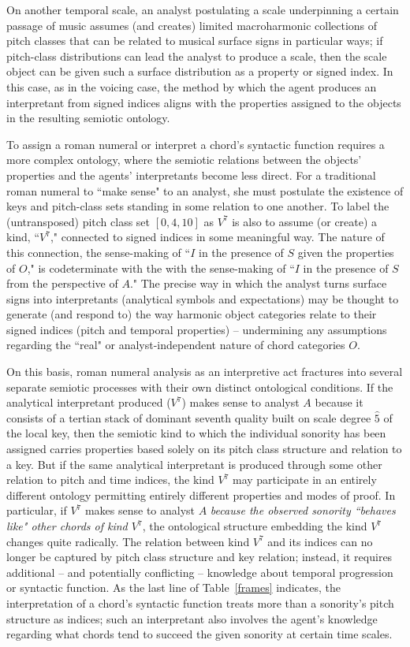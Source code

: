 On another temporal scale, an analyst postulating a scale underpinning a certain passage of music assumes (and creates) limited macroharmonic collections of pitch classes that can be related to musical surface signs in particular ways; if pitch-class distributions can lead the analyst to produce a scale, then the scale object can be given such a surface distribution as a property or signed index.  In this case, as in the voicing case, the method by which the agent produces an interpretant from signed indices aligns with the properties assigned to the objects in the resulting semiotic ontology.

To assign a roman numeral or interpret a chord's syntactic function requires a more complex ontology, where the semiotic relations between the objects' properties and the agents' interpretants become less direct.  For a traditional roman numeral to ``make sense" to an analyst, she must postulate the existence of keys and pitch-class sets standing in some relation to one another.  To label the (untransposed) pitch class set $[0,4,10]$ as $V^7$ is also to assume (or create) a kind, ``$V^7$," connected to signed indices in some meaningful way.  The nature of this connection, the sense-making of ``$I$ in the presence of $S$ given the properties of $O$," is codeterminate with the with the sense-making of ``$I$ in the presence of $S$ from the perspective of $A$."  The precise way in which the analyst turns surface signs into interpretants (analytical symbols and expectations) may be thought to generate (and respond to) the way harmonic object categories relate to their signed indices (pitch and temporal properties) -- undermining any assumptions regarding the ``real" or analyst-independent nature of chord categories $O$.

On this basis, roman numeral analysis as an interpretive act fractures into several separate semiotic processes with their own distinct ontological conditions.  If the analytical interpretant produced ($V^7$) makes sense to analyst $A$ because it consists of a tertian stack of dominant seventh quality built on scale degree $\hat{5}$ of the local key, then the semiotic kind to which the individual sonority has been assigned carries properties based solely on its pitch class structure and relation to a key.  But if the same analytical interpretant is produced through some other relation to pitch and time indices, the kind $V^7$ may participate in an entirely different ontology permitting entirely different properties and modes of proof.  In particular, if $V^7$ makes sense to analyst $A$ \emph{because the observed sonority ``behaves like" other chords of kind $V^7$}, the ontological structure embedding the kind $V^7$ changes quite radically.  The relation between kind $V^7$ and its indices can no longer be captured by pitch class structure and key relation; instead, it requires additional -- and potentially conflicting -- knowledge about temporal progression or syntactic function.  As the last line of Table~\ref{frames} indicates, the interpretation of a chord's syntactic function treats more than a sonority's pitch structure as indices; such an interpretant also involves the agent's knowledge regarding what chords tend to succeed the given sonority at certain time scales.

